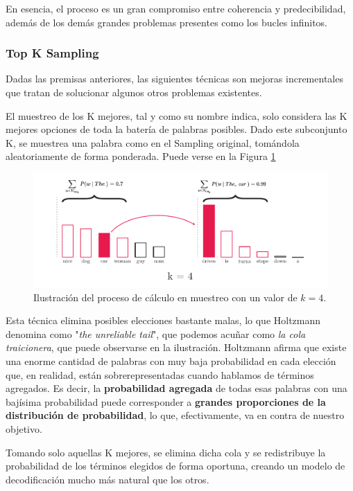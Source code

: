 En esencia, el proceso es un gran compromiso entre coherencia y predecibilidad, además de los demás grandes problemas presentes como los bucles infinitos.

\subsubsection{Top K Sampling}

Dadas las premisas anteriores, las siguientes técnicas son mejoras incrementales que tratan de solucionar algunos otros problemas existentes.

El muestreo de los K mejores, tal y como su nombre indica, solo considera las K mejores opciones de toda la batería de palabras posibles. Dado este subconjunto K, se muestrea una palabra como en el Sampling original, tomándola aleatoriamente de forma ponderada. Puede verse en la Figura \ref{fig:top-k} 


\begin{figure}[h]
	\centering
	\includegraphics[width=.9\textwidth]{media/top k.pdf}
	\caption{Ilustración del proceso de cálculo en muestreo con un valor de $k = 4$.}
	\label{fig:top-k}
\end{figure}

Esta técnica elimina posibles elecciones bastante malas, lo que Holtzmann denomina como "\textit{the unreliable tail}", que podemos acuñar como \textit{la cola traicionera}, que puede observarse en la ilustración. Holtzmann afirma que existe una enorme cantidad de palabras con muy baja probabilidad en cada elección que, en realidad, están sobrerepresentadas cuando hablamos de términos agregados. Es decir, la \textbf{probabilidad agregada} de todas esas palabras con una bajísima probabilidad puede corresponder a \textbf{grandes proporciones de la distribución de probabilidad}, lo que, efectivamente, va en contra de nuestro objetivo.

Tomando solo aquellas K mejores, se elimina dicha cola y se redistribuye la probabilidad de los términos elegidos de forma oportuna, creando un modelo de decodificación mucho más natural que los otros.

